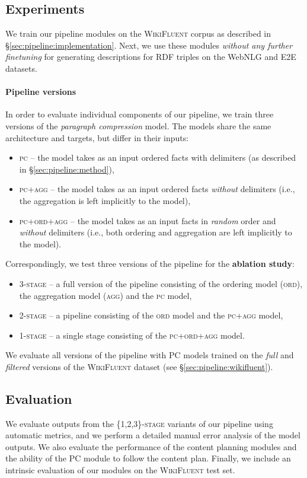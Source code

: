 \subsection{Experiments}
\label{sec:pipeline:experiments}
We train our pipeline modules on the \textsc{WikiFluent} corpus as described in §\ref{sec:pipeline:implementation}. Next, we use these modules \textit{without any further finetuning} for generating descriptions for RDF triples on the WebNLG and E2E datasets.

\paragraph{Pipeline versions} In order to evaluate individual components of our pipeline, we train three versions of the \textit{paragraph compression} model. The models share the same architecture and targets, but differ in their inputs:
\begin{itemize}
    \item \textsc{\ac{pc}} -- the model takes as an input ordered facts with delimiters (as described in §\ref{sec:pipeline:method}),
    \item \textsc{\ac{pc}+agg} -- the model takes as an input ordered facts \textit{without} delimiters (i.e., the aggregation is left implicitly to the model),
    \item \textsc{\ac{pc}+ord+agg} -- the model takes as an input facts in \textit{random} order and \textit{without} delimiters (i.e., both ordering and aggregation are left implicitly to the model).
\end{itemize}
Correspondingly, we test three versions of the pipeline for the \textbf{ablation study}:
\begin{itemize}
    \item \textsc{3-stage} -- a full version of the pipeline consisting of the ordering model (\textsc{ord}), the aggregation model (\textsc{agg}) and the \textsc{\ac{pc}} model,
    \item \textsc{2-stage} -- a pipeline consisting of the \textsc{ord} model and the \textsc{\ac{pc}+agg} model,
    \item \textsc{1-stage} -- a single stage consisting of the \textsc{\ac{pc}+ord+agg} model.
\end{itemize}
We evaluate all versions of the pipeline with PC models trained on the \textit{full} and \textit{filtered} versions of the \textsc{WikiFluent} dataset (see §\ref{sec:pipeline:wikifluent}).


\subsection{Evaluation}
\label{sec:pipeline:eval}
We evaluate outputs from the \textsc{\{1,2,3\}-stage} variants of our pipeline using automatic metrics, and we perform a detailed manual error analysis of the model outputs. We also evaluate the performance of the content planning modules and the ability of the PC module to follow the content plan. Finally, we include an intrinsic evaluation of our modules on the \textsc{WikiFluent} test set.


